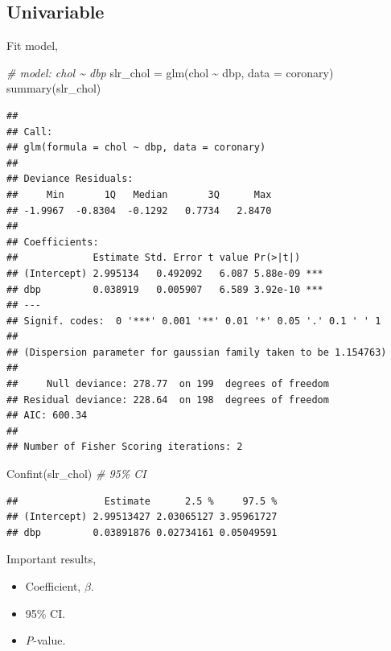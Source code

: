 \documentclass[
]{book}
\makeatletter
\newenvironment{Shaded}{\begin{snugshade}}{\end{snugshade}}
\newcommand{\AttributeTok}[1]{\textcolor[rgb]{0.61,0.61,0.61}{#1}}
\newcommand{\CommentTok}[1]{\textcolor[rgb]{0.37,0.37,0.37}{\textit{#1}}}
\newcommand{\FunctionTok}[1]{\textcolor[rgb]{0,0,0}{#1}}
\newcommand{\NormalTok}[1]{#1}
\newcommand{\OtherTok}[1]{\textcolor[rgb]{0.37,0.37,0.37}{#1}}
\newcommand{\SpecialCharTok}[1]{\textcolor[rgb]{0,0,0}{#1}}
\providecommand{\tightlist}{%
  \setlength{\itemsep}{0pt}\setlength{\parskip}{0pt}}
\newenvironment{kframe}{%
\medskip{}
\setlength{\fboxsep}{.8em}
 \def\at@end@of@kframe{}%
 \ifinner\ifhmode%
  \def\at@end@of@kframe{\end{minipage}}%
  \begin{minipage}{\columnwidth}%
 \fi\fi%
 \def\FrameCommand##1{\hskip\@totalleftmargin \hskip-\fboxsep
 \colorbox{shadecolor}{##1}\hskip-\fboxsep
     \hskip-\linewidth \hskip-\@totalleftmargin \hskip\columnwidth}%
 \MakeFramed {\advance\hsize-\width
   \@totalleftmargin\z@ \linewidth\hsize
   \@setminipage}}%
 {\par\unskip\endMakeFramed%
 \at@end@of@kframe}
\renewenvironment{Shaded}{\begin{kframe}}{\end{kframe}}
\makeatother
\begin{document}
\hypertarget{univariable}{%
\subsection{Univariable}\label{univariable}}

Fit model,

\begin{Shaded}
\begin{Highlighting}[]
\CommentTok{\# model: chol \textasciitilde{} dbp}
\NormalTok{slr\_chol }\OtherTok{=} \FunctionTok{glm}\NormalTok{(chol }\SpecialCharTok{\textasciitilde{}}\NormalTok{ dbp, }\AttributeTok{data =}\NormalTok{ coronary)}
\FunctionTok{summary}\NormalTok{(slr\_chol)}
\end{Highlighting}
\end{Shaded}

\begin{verbatim}
## 
## Call:
## glm(formula = chol ~ dbp, data = coronary)
## 
## Deviance Residuals: 
##     Min       1Q   Median       3Q      Max  
## -1.9967  -0.8304  -0.1292   0.7734   2.8470  
## 
## Coefficients:
##             Estimate Std. Error t value Pr(>|t|)    
## (Intercept) 2.995134   0.492092   6.087 5.88e-09 ***
## dbp         0.038919   0.005907   6.589 3.92e-10 ***
## ---
## Signif. codes:  0 '***' 0.001 '**' 0.01 '*' 0.05 '.' 0.1 ' ' 1
## 
## (Dispersion parameter for gaussian family taken to be 1.154763)
## 
##     Null deviance: 278.77  on 199  degrees of freedom
## Residual deviance: 228.64  on 198  degrees of freedom
## AIC: 600.34
## 
## Number of Fisher Scoring iterations: 2
\end{verbatim}

\begin{Shaded}
\begin{Highlighting}[]
\FunctionTok{Confint}\NormalTok{(slr\_chol)  }\CommentTok{\# 95\% CI}
\end{Highlighting}
\end{Shaded}

\begin{verbatim}
##               Estimate      2.5 %     97.5 %
## (Intercept) 2.99513427 2.03065127 3.95961727
## dbp         0.03891876 0.02734161 0.05049591
\end{verbatim}

Important results,

\begin{itemize}
\tightlist
\item
  Coefficient, \(\beta\).
\item
  95\% CI.
\item
  \emph{P}-value.
\end{itemize}
\end{document}
